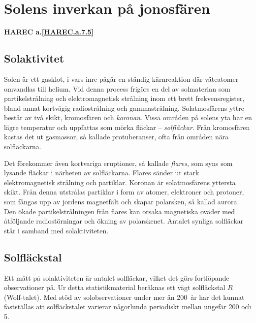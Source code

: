 \section[Solens inverkan]{Solens inverkan på jonosfären}
\textbf{
HAREC a.\ref{HAREC.a.7.5}\label{myHAREC.a.7.5}
}

\subsection{Solaktivitet}

Solen är ett gasklot, i vars inre pågår en ständig kärnreaktion där
väteatomer omvandlas till helium.
Vid denna process frigörs en del av solmaterian som partikelstrålning och
elektromagnetisk strålning inom ett brett frekvensregister, bland annat
kortvågig radiostrålning och gammastrålning.
Solatmosfärens yttre består av två skikt, kromosfären och \emph{koronan}.
Vissa områden på solens yta har en lägre temperatur och uppfattas som mörka
fläckar -- \emph{solfläckar}.
Från kromosfären kastas det ut gasmassor, så kallade protuberanser, ofta från
områden nära solfläckarna.

Det förekommer även kortvariga eruptioner, så kallade \emph{flares}, som syns
som lysande fläckar i närheten av solfläckarna.
Flares sänder ut stark elektromagnetisk strålning och partiklar.
Koronan är solatmosfärens yttersta skikt.
Från denna utstrålas partiklar i form av atomer, elektroner och protoner, som
fångas upp av jordens magnetfält och skapar polarsken, så kallad aurora.
Den ökade partikelstrålningen från flares kan orsaka magnetiska oväder med
åtföljande radiostörningar och ökning av polarskenet.
Antalet synliga solfläckar står i samband med solaktiviteten.

\subsection{Solfläckstal}

Ett mått på solaktiviteten är antalet solfläckar, vilket det görs
fortlöpande observationer på.
Ur detta statistikmaterial beräknas ett vägt solfläckstal \(R\) (Wolf-talet).
Med stöd av solobservationer under mer än 200~år har det kunnat fastställas att
solfläckstalet varierar någorlunda periodiskt mellan ungefär 200 och 5.

